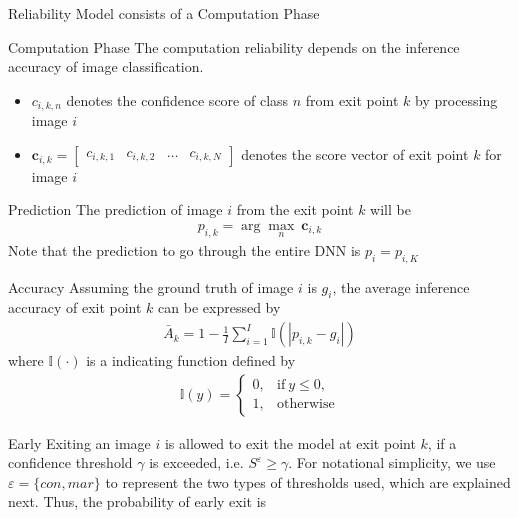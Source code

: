 \begin{enumdescript}
\begin{enumdescript}
		
		\item[Reliability Model] consists of a Computation Phase 
		\begin{enumdescript}
			\item[Computation Phase]  The computation reliability depends on the inference accuracy of image classification.
			\begin{itemize}
				\item $ c_{i,k,n} $ denotes the confidence score of class $ n $ from exit point $ k $ by processing image $ i $
				\item $ \mathbf{c}_{i,k} = \left[\begin{array}{cccc}c_{i,k,1} & c_{i,k,2} & \dots & c_{i,k,N}\end{array}\right] $ denotes the score vector of exit point $ k $ for image $ i $
			\end{itemize}
			\begin{enumdescript}
				\item[Prediction] The prediction of image $ i $ from the exit point $ k $ will be
				\begin{align}
				p_{i,k} = \arg \underset{n}{\max}\: \mathbf{c}_{i,k}
				\end{align}
				Note that the prediction to go through the entire DNN is $ p_i  = p_{i,K} $
				\item[Accuracy] Assuming the ground truth of image $ i $ is $ g_i $, the average inference accuracy of exit point $ k $ can be expressed by
				\begin{align}
				\bar{A}_{k}=1-\frac{1}{I} \sum_{i=1}^{I} \mathbb{I}\left(\left|p_{i,k}-g_{i}\right|\right)
				\end{align}
				where $ \mathbb{I(\cdot)}  $ is a indicating function defined by
				\begin{align}
				\mathbb{I}(y)= \begin{cases}
				0, & \mathrm{if\:} y \leq 0, \\
				1, & \mathrm{otherwise}
				\end{cases}
				\end{align}
			\end{enumdescript}
			\item[Early Exiting] an image $ i $ is allowed to exit the model at exit point $ k $, if a confidence threshold $ \gamma $ is exceeded, i.e. $S^\varepsilon \geq \gamma$. For notational simplicity, we use $ \varepsilon = \{con, mar\} $ to represent the two types of thresholds used, which are explained next. Thus, the probability of early exit is
			\begin{align}

\end{align}
\end{enumdescript}
\end{enumdescript}
\end{enumdescript}
